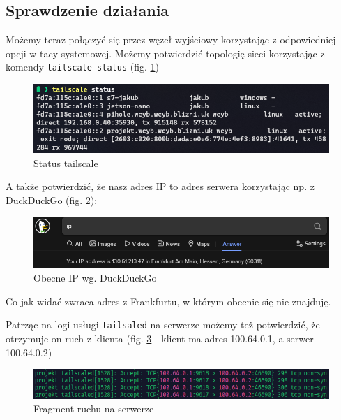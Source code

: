 \documentclass[../main.tex]{subfiles}
\begin{document}
\subsection{Sprawdzenie działania}
Możemy teraz połączyć się przez węzeł wyjściowy korzystając z odpowiedniej opcji w tacy systemowej. Możemy potwierdzić topologię sieci korzystając z komendy \texttt{tailscale status} (fig. \ref{fig:tailscale_status})
\begin{figure}[H]
    \centering
    \includegraphics[scale=1]{tailscale-status.png}
    \caption{Status tailscale}
    \label{fig:tailscale_status}
\end{figure}
\begin{samepage}
A także potwierdzić, że nasz adres IP to adres serwera korzystając np. z DuckDuckGo (fig. \ref{fig:ip_check}):
\begin{figure}[H]
    \centering
    \includegraphics[scale=0.5]{ddg-ip.png}
    \caption{Obecne IP wg. DuckDuckGo}
    \label{fig:ip_check}
\end{figure}
Co jak widać zwraca adres z Frankfurtu, w którym obecnie się nie znajduję.

Patrząc na logi usługi \texttt{tailsaled} na serwerze możemy też potwierdzić, że otrzymuje on ruch z klienta (fig. \ref{fig:tailscale-traffic} - klient ma adres 100.64.0.1, a serwer 100.64.0.2)
\begin{figure}[H]
    \centering
    \includegraphics[scale=1]{tailscale-traffic.png}
    \caption{Fragment ruchu na serwerze}
    \label{fig:tailscale-traffic}
\end{figure}
\end{samepage}
\end{document}
